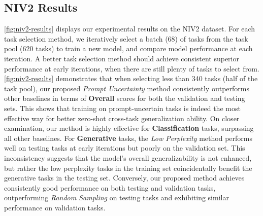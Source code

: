 \subsection{NIV2 Results}
\autoref{fig:niv2-results} displays our experimental results on the NIV2 dataset. For each task selection method, we iteratively select a batch (68) of tasks from the task pool (620 tasks) to train a new model, and compare model performance at each iteration. A better task selection method should achieve consistent superior performance at early iterations, when there are still plenty of tasks to select from.
\autoref{fig:niv2-results} demonstrates that when selecting less than 340 tasks (half of the task pool), our proposed \textit{Prompt Uncertainty} method consistently outperforms other baselines in terms of \textbf{Overall} scores for both the validation and testing sets.
This shows that training on prompt-uncertain tasks is indeed the most effective way for better zero-shot cross-task generalization ability. 
On closer examination, our method is highly effective for \textbf{Classification} tasks, surpassing all other baselines. 
For \textbf{Generative} tasks, the \textit{Low Perplexity} method performs well on testing tasks at early iterations but poorly on the validation set. This inconsistency suggests that the model's overall generalizability is not enhanced, but rather the low perplexity tasks in the training set coincidentally benefit the generative tasks in the testing set. Conversely, our proposed method achieves consistently good performance on both testing and validation tasks, outperforming \textit{Random Sampling} on testing tasks and exhibiting similar performance on validation tasks.

